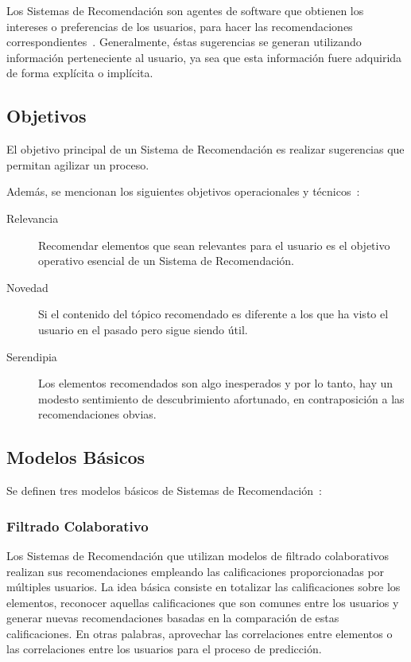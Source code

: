 Los Sistemas de Recomendación son agentes de software que obtienen los intereses
o preferencias de los usuarios, para hacer las recomendaciones correspondientes~\cite{Xiao:2007:EPR:2017327.2017335}.
Generalmente, éstas sugerencias se generan utilizando información perteneciente al usuario,
ya sea que esta información fuere adquirida de forma explícita o implícita.

\subsection{Objetivos}

El objetivo principal de un Sistema de Recomendación es realizar sugerencias 
que permitan agilizar un proceso.

Además, se mencionan los siguientes objetivos operacionales y técnicos~\cite{Aggarwal2016}:

\begin{description}
  \item [Relevancia] Recomendar elementos que sean relevantes para el usuario es el objetivo operativo esencial de un Sistema de Recomendación.
  \item [Novedad] Si el contenido del tópico recomendado es diferente a los que ha visto el usuario en el pasado pero sigue siendo útil.
  \item [Serendipia] Los elementos recomendados son algo inesperados y por lo tanto, hay un modesto sentimiento de descubrimiento afortunado, en contraposición a las recomendaciones obvias.
\end{description}

\subsection{Modelos Básicos}

Se definen tres modelos básicos de Sistemas de Recomendación~\cite{jannach_zanker_felfernig_friedrich_2010}:

\subsubsection{Filtrado Colaborativo}

Los Sistemas de Recomendación que utilizan modelos de filtrado colaborativos
realizan sus recomendaciones empleando las calificaciones proporcionadas por múltiples usuarios.
La idea básica consiste en totalizar las calificaciones sobre los elementos,
reconocer aquellas calificaciones que son comunes entre los usuarios y
generar nuevas recomendaciones basadas en la comparación de estas calificaciones.
En otras palabras, aprovechar las correlaciones entre elementos o
las correlaciones entre los usuarios para el proceso de predicción.

